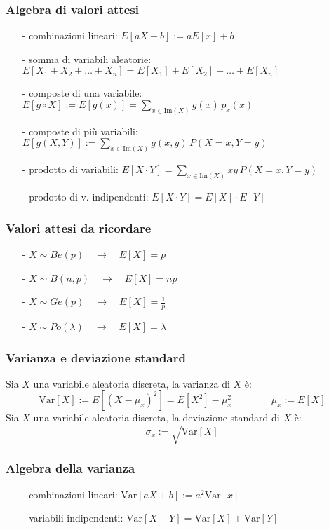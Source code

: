 \documentclass[a4paper]{article}
\newcommand\var{\text{Var}}   %
\begin{document}
\subsubsection*{Algebra di valori attesi}
\begin{itemize}[topsep=3pt, itemsep=0pt]
	\item[-] combinazioni lineari: \(E[aX + b] := aE[x] + b\)
	\item[-] somma di variabili aleatorie: \(E[X_1 + X_2 + \dots + X_n] = E[X_1] + E[X_2] + \dots + E[X_n]\)
	\item[-] composte di una variabile: \(\displaystyle E[g \circ X] := E[g(x)] = \sum_{x \in \text{Im}(X)} g(x) \, p_x(x)\)
	\item[-] composte di più variabili: \(\displaystyle E[g(X,Y)] := \sum_{x \in \text{Im}(X)} g(x,y) \, P(X = x, Y = y)\)
	\item[-] prodotto di variabili: \(\displaystyle E[X \cdot Y] = \sum_{x \in \text{Im}(X)} x y \, P(X = x, Y = y)\)
	\item[-] prodotto di v. indipendenti: \(E[X \cdot Y] = E[X] \cdot E[Y]\)
\end{itemize}

\subsubsection*{Valori attesi da ricordare}
\begin{itemize}[topsep=3pt, itemsep=0pt]
	\item[-] \(X \sim Be(p) \quad \rightarrow \quad E[X] = p\)
	\item[-] \(X \sim B(n,p) \quad \rightarrow \quad E[X] = np\)
	\item[-] \(X \sim Ge(p) \quad \rightarrow \quad E[X] = \frac{1}{p}\)
	\item[-] \(X \sim Po(\lambda) \quad \rightarrow \quad E[X] = \lambda\)
\end{itemize}

\subsubsection*{Varianza e deviazione standard}
Sia \(X\) una variabile aleatoria discreta, la varianza di \(X\) è:
\[\var[X] := E[(X-\mu_x)^2] = E[X^2] - \mu_x^2 \qquad  \qquad \mu_x := E[X]\]
Sia \(X\) una variabile aleatoria discreta, la deviazione standard di \(X\) è:
\[\sigma_x := \sqrt{\var[X]}\]

\subsubsection*{Algebra della varianza}
\begin{itemize}[topsep=3pt, itemsep=0pt]
	\item[-] combinazioni lineari: \(\var[aX + b] := a^2\var[x]\)
	\item[-] variabili indipendenti: \(\var[X + Y] = \var[X] + \var[Y]\)
\end{itemize}
\end{document}
